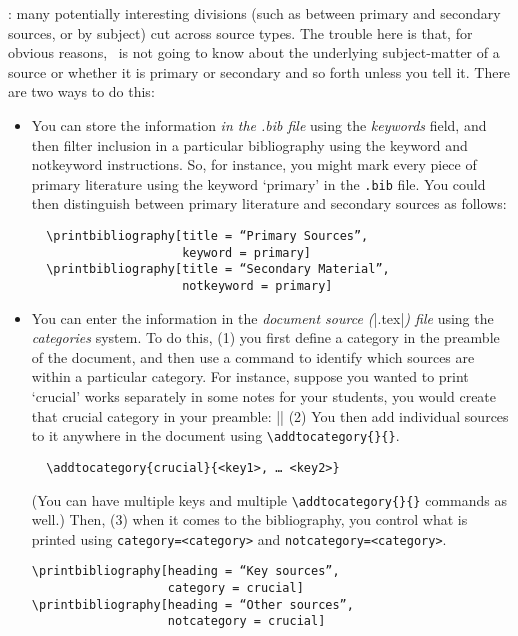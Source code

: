 : many
potentially interesting divisions (such as between primary and
secondary sources, or by subject) cut across source types. The trouble
here is that, for obvious reasons, \biblatex\ is not going to know
about the underlying subject-matter of a source or whether it is
primary or secondary and so forth unless you tell it. There are two
ways to do this:
\begin{itemize}
\item You can store the information \emph{in the .bib file} using the
  \emph{keywords} field, and then filter inclusion in a particular
  bibliography using the keyword and notkeyword instructions. So, for
  instance, you might mark every piece of primary literature using the
  keyword `primary' in the \texttt{.bib} file. You could then
  distinguish between primary literature and secondary sources as
  follows:
\begin{Verbatim}
  \printbibliography[title = “Primary Sources”,
                     keyword = primary]
  \printbibliography[title = “Secondary Material”,
                     notkeyword = primary]
\end{Verbatim}
\item You can enter the information in the \emph{document source
    (}|.tex|\emph{) file} using the \emph{categories} system. To do
  this, (1) you first define a category in the preamble of the
  document, and then use a command to identify which sources are
  within a particular category. For instance, suppose you wanted to
  print `crucial' works separately in some notes for your students,
  you would create that crucial category in your preamble:
  || (2) You then add individual
  sources to it anywhere in the document using
  \texttt{\textbackslash{}addtocategory\{\}\{\}}.

\begin{Verbatim}
  \addtocategory{crucial}{<key1>, … <key2>}
\end{Verbatim}

(You can have multiple keys and multiple
\texttt{\textbackslash{}addtocategory\{\}\{\}} commands as well.)
Then, (3) when it comes to the bibliography, you control what is
printed using \texttt{category=\textless{}category\textgreater{}} and
\texttt{notcategory=\textless{}category\textgreater{}}.
\begin{Verbatim}
\printbibliography[heading = “Key sources”,
                   category = crucial]
\printbibliography[heading = “Other sources”,
                   notcategory = crucial]
\end{Verbatim}
\end{itemize}

